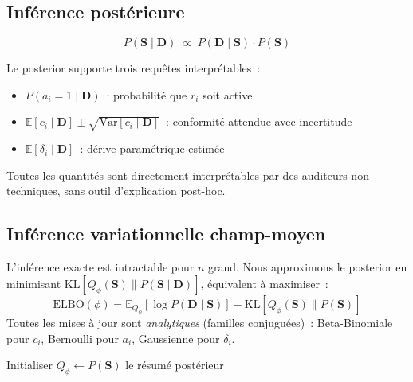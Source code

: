 \documentclass[letterpaper]{article}
\begin{document}
\subsection{Inf\'erence post\'erieure}

\[
  \boxed{P(\mathbf{S} \mid \mathbf{D}) \;\propto\;
    P(\mathbf{D} \mid \mathbf{S}) \cdot P(\mathbf{S})}
\]

Le posterior supporte trois requ\^etes interpr\'etables~:
\begin{itemize}[leftmargin=1.5em]
  \item $P(a_i{=}1 \mid \mathbf{D})$~: probabilit\'e que $r_i$ soit active
  \item $\mathbb{E}[c_i \mid \mathbf{D}] \pm \sqrt{\mathrm{Var}[c_i \mid \mathbf{D}]}$~:
        conformit\'e attendue avec incertitude
  \item $\mathbb{E}[\delta_i \mid \mathbf{D}]$~: d\'erive param\'etrique estim\'ee
\end{itemize}
Toutes les quantit\'es sont directement interpr\'etables par des auditeurs
non techniques, sans outil d'explication post-hoc.

\subsection{Inf\'erence variationnelle champ-moyen}

L'inf\'erence exacte est intractable pour $n$ grand. Nous approximons
le posterior en minimisant $\mathrm{KL}[Q_\phi(\mathbf{S}) \|
P(\mathbf{S} \mid \mathbf{D})]$, \'equivalent \`a maximiser~:
\[
  \mathrm{ELBO}(\phi) = \mathbb{E}_{Q_\phi}[\log P(\mathbf{D} \mid \mathbf{S})]
  - \mathrm{KL}[Q_\phi(\mathbf{S}) \| P(\mathbf{S})]
\]
Toutes les mises \`a jour sont \emph{analytiques} (familles conjugu\'ees)~:
Beta-Binomiale pour $c_i$, Bernoulli pour $a_i$, Gaussienne pour $\delta_i$.

\begin{algorithm}[H]
\SetAlgoLined
{}
Initialiser $Q_\phi \leftarrow P(\mathbf{S})$\;
\Retourner le r\'esum\'e post\'erieur
\caption{RSI : Inf\'erence d'\'Etat de R\`egles (VI champ-moyen)}
\label{alg:rsi}
\end{algorithm}
\end{document}
